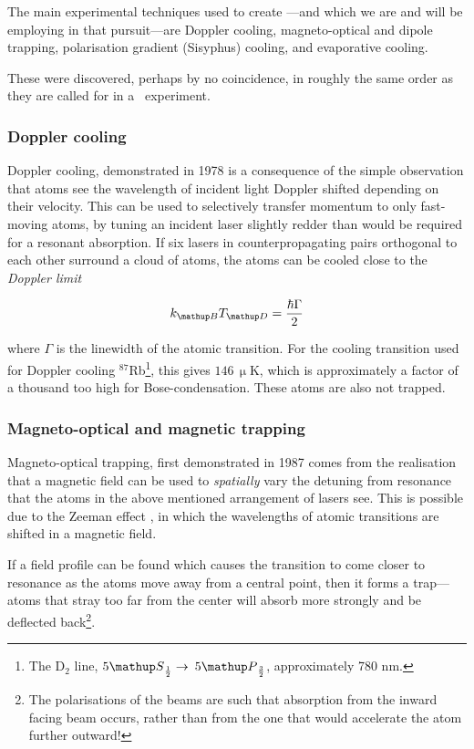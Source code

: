 The main experimental techniques used to create \bec---and which we are and will be employing in that pursuit---are Doppler cooling, magneto-optical and dipole trapping, polarisation gradient (Sisyphus) cooling, and evaporative cooling.

These were discovered, perhaps by no coincidence, in roughly the same order as they are called for in a \bec\ experiment.

\subsubsection{Doppler cooling}

Doppler cooling, demonstrated in 1978 \cite{wineland_radiation-pressure_1978} is a consequence of the simple observation that atoms see the wavelength of incident light Doppler shifted depending on their velocity. This can be used to selectively transfer momentum to only fast-moving atoms, by tuning an incident laser slightly redder than would be required for a resonant absorption. If six lasers in counterpropagating pairs orthogonal to each other surround a cloud of atoms, the atoms can be cooled close to the \emph{Doppler limit} \cite[p 58]{metcalf_laser_1999}

\begin{equation}
k_\up{B} T_\up{D} = \frac{\hbar\Gamma}2
\end{equation}

where $\Gamma$ is the linewidth of the atomic transition. For the cooling transition used for Doppler cooling $^{87}$Rb\footnote{The D$_2$ line, $5\up{S}_{\frac12}\rightarrow$ $5\up{P}_{\frac32}$, approximately 780 nm.}, this gives $146\,\upmu$K, which is approximately a factor of a thousand too high for Bose-condensation. These atoms are also not trapped.

\subsubsection{Magneto-optical and magnetic trapping}

Magneto-optical trapping, first demonstrated in 1987 \cite{raab_trapping_1987} comes from the realisation that a magnetic field can be used to \emph{spatially} vary the detuning from resonance that the atoms in the above mentioned arrangement of lasers see. This is possible due to the Zeeman effect \cite{zeeman_influence_1897}, in which the wavelengths of atomic transitions are shifted in a magnetic field.

If a field profile can be found which causes the transition to come closer to resonance as the atoms move away from a central point, then it forms a trap---atoms  that stray too far from the center will absorb more strongly and be deflected back\footnote{The polarisations of the beams are such that absorption from the inward facing beam occurs, rather than from the one that would accelerate the atom further outward!}.

